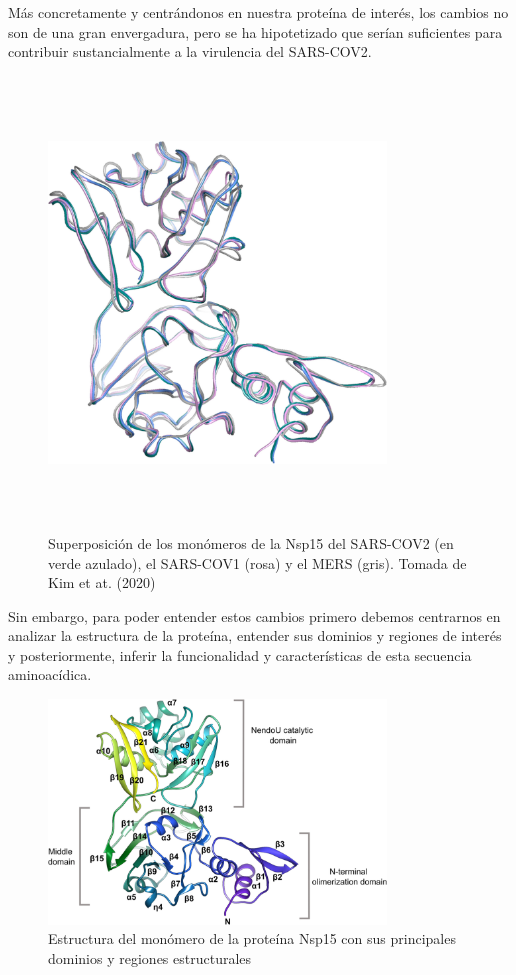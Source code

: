\documentclass[12pt]{article}
\begin{document}
Más concretamente y centrándonos en nuestra proteína de interés, los cambios no son de una gran envergadura, pero se ha hipotetizado que serían suficientes para contribuir sustancialmente a la virulencia del SARS-COV2.
\begin{figure}[H]
\centering
\includegraphics[width=0.8\textwidth, height=12cm]{fig2}
\caption{Superposición de los monómeros de la Nsp15 del SARS-COV2 (en verde azulado), el SARS-COV1 (rosa) y el MERS (gris). Tomada de Kim et at. (2020)  }
\end{figure}

Sin embargo, para poder entender estos cambios primero debemos centrarnos en analizar la estructura de la proteína, entender sus dominios y regiones de interés y posteriormente, inferir la funcionalidad y características de esta secuencia aminoacídica.
\newline

\begin{figure}[H]
\centering
\includegraphics[width=0.8\textwidth]{fig3}
\caption{Estructura del monómero de la proteína Nsp15 con sus principales dominios y regiones estructurales}
\end{figure}

\end{document}

